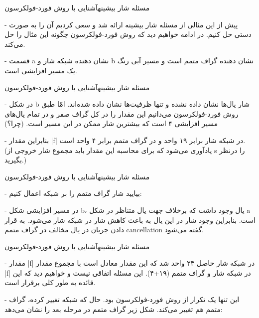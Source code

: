 \begin{itemframe}{مسئله شار بیشینه}{آشنایی با روش فورد-فولکرسون}
\item[-]
پیش از این مثالی از مسئله شار بیشینه ارائه شد و سعی کردیم آن را به صورت دستی حل کنیم. در ادامه خواهیم دید که روش فورد-فولکرسون چگونه این مثال را حل می‌کند.
\item[-]
قسمت a نشان دهنده شبکه شار و b نشان دهنده گراف متمم است و مسیر آبی رنگ یک مسیر افزایشی است.
\end{itemframe}

\begin{itemframe}{مسئله شار بیشینه}{آشنایی با روش فورد-فولکرسون}
\item[-]
در شکل b شار یال‌ها نشان داده نشده و تنها ظرفیت‌ها نشان داده شده‌اند. امّا طبق روش فورد-فولکرسون می‌دانیم این مقدار را در کل گراف صفر و در تمام یال‌های مسیر افزایشی ۴ است که بیشترین شار ممکن در این مسیر است. (چرا؟)
\item[-]
بنابراین مقدار |f| در شبکه شار برابر ۱۹ واحد و در گراف متمم برابر ۴ واحد است. (يادآوری می‌شود که برای محاسبه این مقدار باید مجموع شار خروجی از s را درنظر بگیرید.)
\end{itemframe}

\begin{itemframe}{مسئله شار بیشینه}{آشنایی با روش فورد-فولکرسون}
\item[-]
بیایید شار گراف متمم را بر شبکه اعمال کنیم:
\item[-]
در مسیر افزایشی شکل b، یال
وجود داشت که برخلاف جهت یال متناظر در شکل a است. بنابراین وجود شار در این یال به باعث کاهش شار در شبکه شار می‌شود. به قرار دادن جریان در یال مخالف در گراف متمم cancellation گفته می‌شود.
\end{itemframe}

\begin{itemframe}{مسئله شار بیشینه}{آشنایی با روش فورد-فولکرسون}
\item[-]
مقدار |f| در شبکه شار حاصل ۲۳ واحد شد که این مقدار معادل است با مجموع مقدار |f| در شبکه شار و گراف متمم (۱۹‌+۴). این مسئله اتفاقی نیست و خواهیم دید که این قائده به طور کلی برقرار است.
\item[-]
این تنها یک تکرار از روش فورد-فولکرسون بود. حال که شبکه تغییر کرده، گراف متمم هم تغییر می‌کند. شکل زیر گراف متمم در مرحله بعد را نشان می‌دهد:
\end{itemframe}
